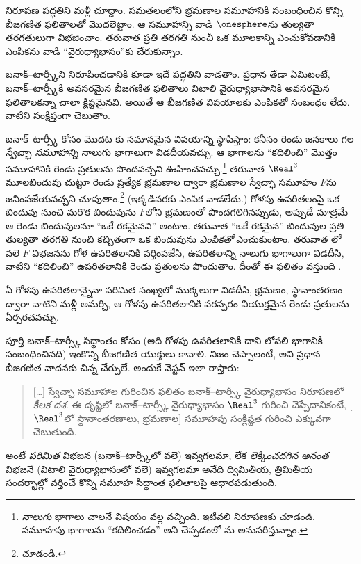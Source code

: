 \documentclass[../../../include/open-logic-section]{subfiles}
\begin{document}
నిరూపణ పద్ధతిని మళ్లీ చూద్దాం. సమతలంలోని భ్రమణాల సమూహానికి సంబంధించిన కొన్ని బీజగణిత ఫలితాలతో మొదలెట్టాం. ఆ సమూహాన్ని వాడి $\onesphere$ను తుల్యతా తరగతులుగా విభజించాం. తరువాత ప్రతి తరగతి నుంచీ ఒక మూలకాన్ని ఎంచుకోవడానికి ఎంపికను వాడి ``వైరుధ్యాభాసం''కు చేరుకున్నాం.

బనాక్--టార్స్కీని నిరూపించడానికి కూడా ఇదే పద్ధతిని వాడతాం. ప్రధాన తేడా ఏమిటంటే, బనాక్--టార్స్కీకి అవసరమైన బీజగణిత ఫలితాలు విటాలి వైరుధ్యాభాసానికి
అవసరమైన ఫలితాలకన్నా చాలా క్లిష్టమైనవి. అయితే ఆ బీజగణిత విషయాలకు ఎంపికతో సంబంధం లేదు. వాటిని సంక్షిప్తంగా చెబుతాం.

బనాక్--టార్స్కీ కోసం మొదట కు సమానమైన విషయాన్ని స్థాపిస్తాం: కనీసం రెండు జనకాలు గల \emph{స్వేచ్ఛా సమూహాన్ని} నాలుగు భాగాలుగా విడదీయవచ్చు. ఆ భాగాలను ``కదిలించి'' మొత్తం సమూహానికి రెండు ప్రతులను పొందవచ్చని ఊహించవచ్చు.\footnote{\emph{నాలుగు} భాగాలు చాలనే విషయం \cite{Robinson1947} వల్ల వచ్చింది. ఇటీవలి నిరూపణకు \citet[Theorem 5.2]{Wagon2016} చూడండి. సమూహపు భాగాలను ``కదిలించడం'' అని చెప్పడంలో \citet[p.~3]{Weston2003}ను అనుసరిస్తున్నాం.} తరువాత $\Real^3$ మూలబిందువు చుట్టూ రెండు ప్రత్యేక భ్రమణాల ద్వారా భ్రమణాల స్వేచ్ఛా సమూహం $F$ను జనింపజేయవచ్చని చూపుతాం.\footnote{\citet[Theorem 2.1]{Wagon2016} చూడండి.} (ఇక్కడివరకు ఎంపిక వాడలేదు.) గోళపు ఉపరితలంపై ఒక బిందువు నుంచి మరొక బిందువును $F$లోని
భ్రమణంతో పొందగలిగినప్పుడు, అప్పుడే మాత్రమే ఆ రెండు బిందువులనూ ``ఒకే రకమైనవి''
అంటాం. తరువాత ``ఒకే రకమైన'' బిందువుల ప్రతి తుల్యతా తరగతి నుంచి కచ్చితంగా ఒక బిందువును \emph{ఎంపికతో} ఎంచుకుంటాం. తరువాత లో వలె $F$ విభజనను గోళ ఉపరితలానికి వర్తింపజేసి, ఉపరితలాన్ని నాలుగు భాగాలుగా విడదీసి, వాటిని ``కదిలించి'' ఉపరితలానికి రెండు ప్రతులను పొందుతాం. దీంతో ఈ ఫలితం వస్తుంది \citep{Hausdorff1914}.
%

\begin{thm}[హౌస్‌డార్ఫ్ వైరుధ్యాభాసం ($\ZFC$లో)]
ఏ గోళపు ఉపరితలాన్నైనా పరిమిత సంఖ్యలో ముక్కలుగా విడదీసి, భ్రమణం, స్థానాంతరణం ద్వారా వాటిని మళ్లీ అమర్చి, ఆ గోళపు ఉపరితలానికి పరస్పరం వియుక్తమైన రెండు ప్రతులను ఏర్పరచవచ్చు.
\end{thm}

పూర్తి బనాక్--టార్స్కీ సిద్ధాంతం కోసం (అది గోళపు ఉపరితలానికీ దాని లోపలి భాగానికీ సంబంధించినది) ఇంకొన్ని బీజగణిత యుక్తులు కావాలి. నిజం చెప్పాలంటే, అవి ప్రధాన బీజగణిత వాదనకు చిన్న చేర్పులే. అందుకే వెస్టన్ ఇలా రాస్తారు:
\begin{quote}
  [\ldots] స్వేచ్ఛా సమూహాల గురించిన ఫలితం బనాక్--టార్స్కీ వైరుధ్యాభాసం నిరూపణలో \emph{కీలక దశ}. ఈ దృష్టిలో బనాక్--టార్స్కీ వైరుధ్యాభాసం $\Real^3$ గురించి చెప్పేదానికంటే, [$\Real^3$లో స్థానాంతరణాలు, భ్రమణాల] సమూహపు సంక్లిష్టత గురించి ఎక్కువగా చెబుతుంది. \cite[p.~16]{Weston2003}
\end{quote}
అంటే \emph{పరిమిత} విభజన (బనాక్--టార్స్కీలో వలె) ఇవ్వగలమా, లేక \emph{లెక్కించదగిన అనంత} విభజనే (విటాలి వైరుధ్యాభాసంలో వలె) ఇవ్వగలమా అనేది ద్విమితీయ, త్రిమితీయ సందర్భాల్లో వర్తించే కొన్ని సమూహ సిద్ధాంత ఫలితాలపై ఆధారపడుతుంది.
\end{document}
